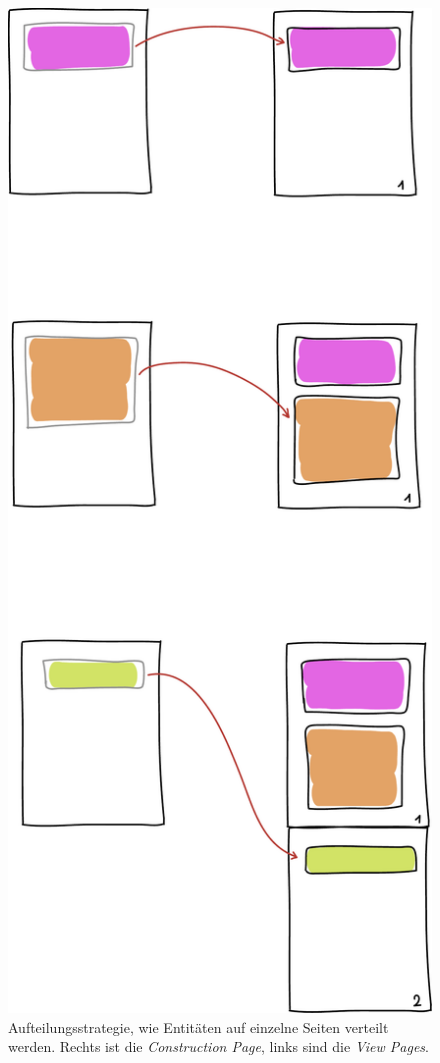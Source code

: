 \newpage
\begin{figure}[h!]
  \centering
    \includegraphics[height=0.9\textheight]{figures/aufteilungsstrategie.pdf}
  \caption{Aufteilungsstrategie, wie Entitäten auf einzelne Seiten
           verteilt werden. Rechts ist die \emph{Construction Page},
           links sind die \emph{View Pages}.}
  \label{fig-aufteilungsstrategie}
\end{figure}
\newpage

